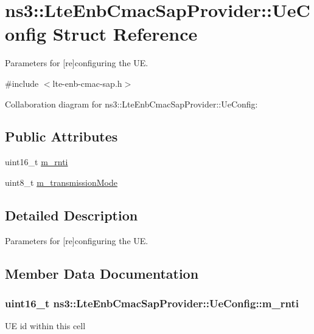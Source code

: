 \hypertarget{structns3_1_1LteEnbCmacSapProvider_1_1UeConfig}{}\section{ns3\+:\+:Lte\+Enb\+Cmac\+Sap\+Provider\+:\+:Ue\+Config Struct Reference}
\label{structns3_1_1LteEnbCmacSapProvider_1_1UeConfig}


Parameters for \mbox{[}re\mbox{]}configuring the UE.  




{\ttfamily \#include $<$lte-\/enb-\/cmac-\/sap.\+h$>$}



Collaboration diagram for ns3\+:\+:Lte\+Enb\+Cmac\+Sap\+Provider\+:\+:Ue\+Config\+:
\subsection*{Public Attributes}
\begin{DoxyCompactItemize}
\item 
uint16\+\_\+t \hyperlink{structns3_1_1LteEnbCmacSapProvider_1_1UeConfig_a9daa4a42e168a03a943998a123e05fc0}{m\+\_\+rnti}
\item 
uint8\+\_\+t \hyperlink{structns3_1_1LteEnbCmacSapProvider_1_1UeConfig_acbdebc9d10dc9f315f5ca456ebd97b9d}{m\+\_\+transmission\+Mode}
\end{DoxyCompactItemize}


\subsection{Detailed Description}
Parameters for \mbox{[}re\mbox{]}configuring the UE. 

\subsection{Member Data Documentation}
\subsubsection[{\texorpdfstring{m\+\_\+rnti}{m_rnti}}]{\setlength{\rightskip}{0pt plus 5cm}uint16\+\_\+t ns3\+::\+Lte\+Enb\+Cmac\+Sap\+Provider\+::\+Ue\+Config\+::m\+\_\+rnti}\hypertarget{structns3_1_1LteEnbCmacSapProvider_1_1UeConfig_a9daa4a42e168a03a943998a123e05fc0}{}\label{structns3_1_1LteEnbCmacSapProvider_1_1UeConfig_a9daa4a42e168a03a943998a123e05fc0}
UE id within this cell 
